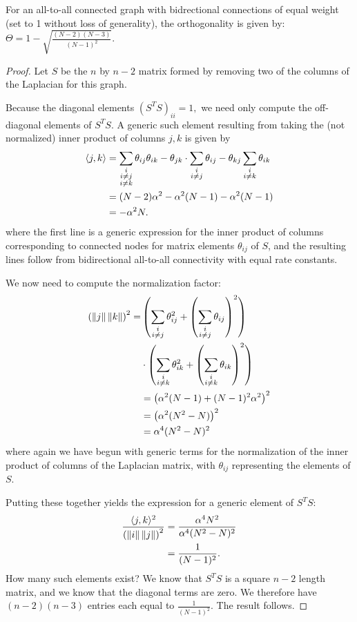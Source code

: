 \begin{prop}{For an all-to-all connected graph with bidrectional connections of equal weight (set to 1 without loss of generality), the orthogonality is given by: $\Theta  = 1 - \sqrt{ \frac{(N-2)(N-3)}{(N-1)^2}}$. 
}
\end{prop}
\begin{proof}
Let $S$ be the $n$ by $n-2$ matrix formed by removing two of the columns of the Laplacian for this graph.

Because the diagonal elements $(S^TS)_{ii} = 1,$ we need only compute the off-diagonal elements of $S^TS.$  A generic such element resulting from taking the (not normalized) inner product of columns $j, k$ is given by
\[
\begin{aligned}
\langle j, k \rangle &= \sum_{\substack{ i\\ i \neq j\\ i\neq k}}\theta_{ij}\theta_{ik} - \theta_{jk}\cdot\sum_{\substack{ i\\ i\neq j}} \theta_{ij} - \theta_{kj}\sum_{\substack{ i\\ i\neq k}} \theta_{ik}\\
& = (N-2)\alpha^2-\alpha^2(N-1)-\alpha^2(N-1)\\
&=-\alpha^2N.\\
\end{aligned}
\]
where the first line is a generic expression for the inner product of columns corresponding to connected nodes for matrix elements $\theta_{ij}$ of $S$, and the resulting lines follow from bidirectional all-to-all connectivity with equal rate constants.

We now need to compute the normalization factor:
\[
\begin{aligned}
\left(\left\lVert j\right\rVert\left\lVert k\right\rVert\right)^2 =& 
\left(\sum_{\substack{ i\\ i\neq j}}\theta^2_{ij} + \left(\sum_{\substack{ i\\ i\neq j}}\theta_{ij}\right)^2\right)\\
&\cdot \left(\sum_{\substack{ i\\ i\neq k}}\theta^2_{ik} + \left(\sum_{\substack{ i\\ i\neq k}}\theta_{ik}\right)^2\right)\\
&= \left(\alpha^2(N-1) + (N-1)^2\alpha^2\right)^2\\
&= \left(\alpha^2(N^2-N)\right)^2\\
& = \alpha^4(N^2-N)^2
\end{aligned}
\]
where again we have begun with generic terms for the normalization of the inner product of columns of the Laplacian matrix, with  $\theta_{ij}$ representing the elements of $S$.

Putting these together yields the expression for a generic element of $S^TS$:
\[
\begin{aligned}
\frac{\langle j, k \rangle^2}{\left(\left\lVert i\right\rVert\left\lVert j\right\rVert\right)^2} &= \frac{\alpha^4N^2}{\alpha^4(N^2-N)^2}\\
& = \frac{1}{(N-1)^2}.
\end{aligned}
\]
How many such elements exist?  We know that $S^TS$ is a square $n-2$ length matrix, and we know that the diagonal terms are zero.  We therefore have $(n-2)(n-3)$ entries each equal to $\frac{1}{(N-1)^2}.$  The result follows.
\end{proof}


